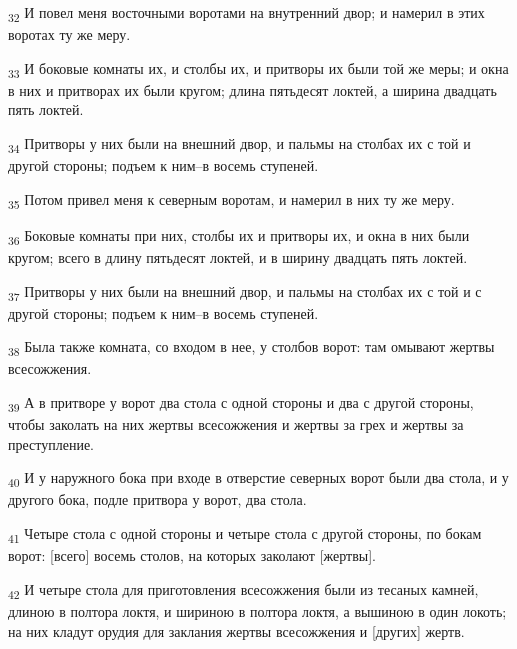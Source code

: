 \begin{tcolorbox}
\textsubscript{32} И повел меня восточными воротами на внутренний двор; и намерил в этих воротах ту же меру.
\end{tcolorbox}
\begin{tcolorbox}
\textsubscript{33} И боковые комнаты их, и столбы их, и притворы их были той же меры; и окна в них и притворах их были кругом; длина пятьдесят локтей, а ширина двадцать пять локтей.
\end{tcolorbox}
\begin{tcolorbox}
\textsubscript{34} Притворы у них были на внешний двор, и пальмы на столбах их с той и другой стороны; подъем к ним--в восемь ступеней.
\end{tcolorbox}
\begin{tcolorbox}
\textsubscript{35} Потом привел меня к северным воротам, и намерил в них ту же меру.
\end{tcolorbox}
\begin{tcolorbox}
\textsubscript{36} Боковые комнаты при них, столбы их и притворы их, и окна в них были кругом; всего в длину пятьдесят локтей, и в ширину двадцать пять локтей.
\end{tcolorbox}
\begin{tcolorbox}
\textsubscript{37} Притворы у них были на внешний двор, и пальмы на столбах их с той и с другой стороны; подъем к ним--в восемь ступеней.
\end{tcolorbox}
\begin{tcolorbox}
\textsubscript{38} Была также комната, со входом в нее, у столбов ворот: там омывают жертвы всесожжения.
\end{tcolorbox}
\begin{tcolorbox}
\textsubscript{39} А в притворе у ворот два стола с одной стороны и два с другой стороны, чтобы заколать на них жертвы всесожжения и жертвы за грех и жертвы за преступление.
\end{tcolorbox}
\begin{tcolorbox}
\textsubscript{40} И у наружного бока при входе в отверстие северных ворот были два стола, и у другого бока, подле притвора у ворот, два стола.
\end{tcolorbox}
\begin{tcolorbox}
\textsubscript{41} Четыре стола с одной стороны и четыре стола с другой стороны, по бокам ворот: [всего] восемь столов, на которых заколают [жертвы].
\end{tcolorbox}
\begin{tcolorbox}
\textsubscript{42} И четыре стола для приготовления всесожжения были из тесаных камней, длиною в полтора локтя, и шириною в полтора локтя, а вышиною в один локоть; на них кладут орудия для заклания жертвы всесожжения и [других] жертв.
\end{tcolorbox}
